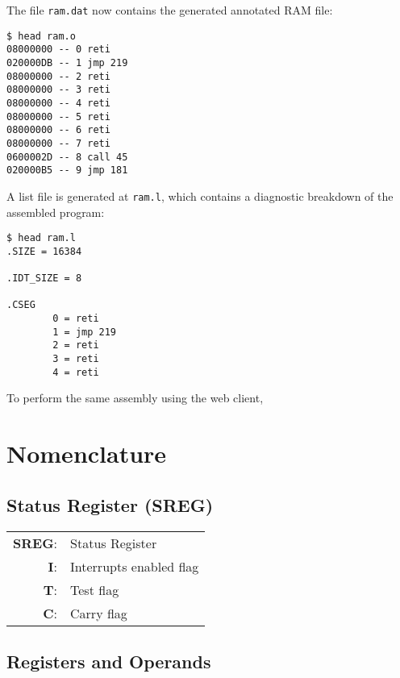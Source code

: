 \documentclass[12pt,twoside]{report}
\begin{document}
The file \texttt{ram.dat} now contains the generated annotated RAM
file:

\begin{verbatim}
$ head ram.o
08000000 -- 0 reti
020000DB -- 1 jmp 219
08000000 -- 2 reti
08000000 -- 3 reti
08000000 -- 4 reti
08000000 -- 5 reti
08000000 -- 6 reti
08000000 -- 7 reti
0600002D -- 8 call 45
020000B5 -- 9 jmp 181
\end{verbatim}

A list file is generated at \texttt{ram.l}, which contains a
diagnostic breakdown of the assembled program:

\begin{verbatim}
$ head ram.l
.SIZE = 16384

.IDT_SIZE = 8

.CSEG
        0 = reti
        1 = jmp 219
        2 = reti
        3 = reti
        4 = reti
\end{verbatim}

To perform the same assembly using the web client,


\section{Nomenclature}

\subsection{Status Register (SREG)}

\begin{tabular}{ | r | l | }
  \hline
  \textbf{SREG}: & Status Register \\
  \textbf{I}: & Interrupts enabled flag \\
  \textbf{T}: & Test flag \\
  \textbf{C}: & Carry flag \\
  \hline
\end{tabular}

\subsection{Registers and Operands}
\end{document}
